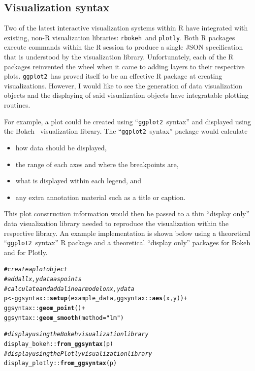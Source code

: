 \documentclass[stat,dissertation]{puthesis}\usepackage[]{graphicx}\usepackage{xcolor}
\makeatletter
\newcommand{\hlstr}[1]{\textcolor[rgb]{0.192,0.494,0.8}{#1}}%
\newcommand{\hlcom}[1]{\textcolor[rgb]{0.678,0.584,0.686}{\textit{#1}}}%
\newcommand{\hlopt}[1]{\textcolor[rgb]{0,0,0}{#1}}%
\newcommand{\hlstd}[1]{\textcolor[rgb]{0.345,0.345,0.345}{#1}}%
\newcommand{\hlkwb}[1]{\textcolor[rgb]{0.69,0.353,0.396}{#1}}%
\newcommand{\hlkwc}[1]{\textcolor[rgb]{0.333,0.667,0.333}{#1}}%
\newcommand{\hlkwd}[1]{\textcolor[rgb]{0.737,0.353,0.396}{\textbf{#1}}}%
\newenvironment{kframe}{%
 \def\at@end@of@kframe{}%
 \ifinner\ifhmode%
  \def\at@end@of@kframe{\end{minipage}}%
  \begin{minipage}{\columnwidth}%
 \fi\fi%
 \def\FrameCommand##1{\hskip\@totalleftmargin \hskip-\fboxsep
 \colorbox{shadecolor}{##1}\hskip-\fboxsep
     \hskip-\linewidth \hskip-\@totalleftmargin \hskip\columnwidth}%
 \MakeFramed {\advance\hsize-\width
   \@totalleftmargin\z@ \linewidth\hsize
   \@setminipage}}%
 {\par\unskip\endMakeFramed%
 \at@end@of@kframe}
\newenvironment{knitrout}{}{} %
\renewenvironment{knitrout}{\setstretch{1}}{}
\newcommand{\pkg}[1]{\texttt{#1}}
\newcommand{\ggplot}{\pkg{ggplot2}}
\makeatother
\begin{document}
\subsection{Visualization syntax}

Two of the latest interactive visualization systems within R have integrated with existing, non-R visualization libraries: \pkg{rbokeh}~and \pkg{plotly}.  Both R packages execute commands within the R session to produce a single JSON specification that is understood by the visualization library.  Unfortunately, each of the R packages reinvented the wheel when it came to adding layers to their respective plots.  \ggplot~has proved itself to be an effective R package at creating visualizations.  However, I would like to see the generation of data visualization objects and the displaying of said visualization objects have integratable plotting routines.

For example, a plot could be created using ``\ggplot~syntax'' and displayed using the Bokeh~\cite{bokeh} visualization library.  The ``\ggplot~syntax'' package would calculate
\begin{itemize}
  \item how data should be displayed,
  \item the range of each axes and where the breakpoints are,
  \item what is displayed within each legend, and
  \item any extra annotation material such as a title or caption.
\end{itemize}
This plot construction information would then be passed to a thin ``display only'' data visualization library needed to reproduce the visualization within the respective library.  An example implementation is shown below using a theoretical ``\ggplot~syntax'' R package  and a theoretical ``display only'' packages  for Bokeh and  for Plotly.

\begin{knitrout}\small
{}\color{fgcolor}\begin{kframe}
\begin{alltt}
\hlcom{# create a plot object}
\hlcom{#   add all x,y data as points}
\hlcom{#   calculate and add a linear model on x,y data}
\hlstd{p} \hlkwb{<-} \hlstd{ggsyntax}\hlopt{::}\hlkwd{setup}\hlstd{(example_data, ggsyntax}\hlopt{::}\hlkwd{aes}\hlstd{(x, y))} \hlopt{+}
  \hlstd{ggsyntax}\hlopt{::}\hlkwd{geom_point}\hlstd{()} \hlopt{+}
  \hlstd{ggsyntax}\hlopt{::}\hlkwd{geom_smooth}\hlstd{(}\hlkwc{method} \hlstd{=} \hlstr{"lm"}\hlstd{)}

\hlcom{# display using the Bokeh visualization library}
\hlstd{display_bokeh}\hlopt{::}\hlkwd{from_ggsyntax}\hlstd{(p)}
\hlcom{# display using the Plotly visualization library}
\hlstd{display_plotly}\hlopt{::}\hlkwd{from_ggsyntax}\hlstd{(p)}
\end{alltt}
\end{kframe}
\end{knitrout}
\end{document}
